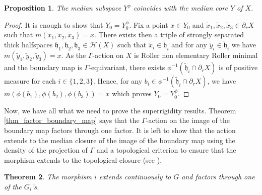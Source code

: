 \documentclass{amsart}
\numberwithin{equation}{section}
\newtheorem{thm}{Theorem}[section]
\newtheorem{prop}[thm]{Proposition}
\newcommand{\HH}{\mathcal{H}}     %
\newcommand{\hh}{\mathfrak{h}}    %
\theoremstyle{definition}
\begin{document}
\begin{prop}
   The median subspace $Y^\phi$ coincides with the median core $Y$ of $X$.
\end{prop}
\begin{proof}
    It is enough to show that $Y_0=Y_0^\phi$. Fix a point $x\in Y_0$ and $\tilde{x}_1,\tilde{x}_2,\tilde{x}_3\in\partial_r X$ such that $m(\tilde{x}_1,\tilde{x}_2,\tilde{x}_3)=x$. There exists then a triple of strongly separated thick halfspaces $\hh_1,\hh_2,\hh_3\in\HH(X)$ such that $\tilde{x}_i\in\tilde{\hh}_i$ and for any $\tilde{y}_i\in\tilde{\hh}_i$ we have $m(\tilde{y}_1,\tilde{y}_2,\tilde{y}_3)=x$. As the $\Gamma$-action on $X$ is Roller non elementary Roller minimal and the boundary map is $\Gamma$-equivariant, there exists $\phi^{-1}(\tilde{\hh}_i\cap\partial_r X)$ is of positive measure for each $i\in\{1,2,3\}$. Hence, for any $b_i\in \phi^{-1}(\tilde{\hh}_i\cap\partial_r X)$, we have $m(\phi(b_1),\phi(b_2),\phi(b_3))=x$ which proves $Y_0=Y_0^\phi$.
\end{proof}
\color{black}
Now, we have all what we need to prove the superrigidity results. Theorem \ref{thm_factor_boundary_map} says that the $\Gamma$-action on the image of the boundary map factors through one factor. It is left to show that the action extends to the median closure of the image of the boundary map using the density of the projection of $\Gamma$ and a topological criterion to ensure that the morphism extends to the topological closure (see \cite[Proposition 4.3]{Shalom-superrigidity}).
    \begin{thm}\label{thm_superrigidity_principal}
        The morphism $i$ extends continuously to $G$ and factors through one of the $G_i$'s. 
    \end{thm}
\end{document}
